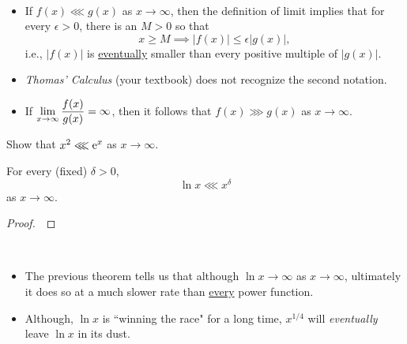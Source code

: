 \begin{remark}\,
\begin{itemize}
\item If $f(x)\lll g(x)$ as $x\to\infty$, then the definition of limit implies that for every $\epsilon>0$, there is an $M>0$ so that
\begin{equation*}
x\ge M\implies |f(x)|\le \epsilon |g(x)|,
\end{equation*}
i.e., $|f(x)|$ is \underline{eventually} smaller than every positive multiple of $|g(x)|$.
\item \textit{Thomas' Calculus} (your textbook) does not recognize the second notation.
\item If $\displaystyle\lim_{x\to\infty}\frac{f(x)}{g(x)} = \infty$, then it follows that $f(x)\ggg g(x)$ as $x\to\infty$.
\end{itemize}
\end{remark}

\begin{example}
Show that $x^2\lll \mathrm{e}^x$ as $x\to\infty$.
\end{example}

\newpage

\begin{theorem}
For every (fixed) $\delta>0$, 
\begin{equation*}
\ln x\lll x^\delta
\end{equation*}
as $x\to\infty$.
\end{theorem}
\begin{proof}\,

\vspace{6in}
\end{proof}

\newpage

\begin{remark}\,
\begin{itemize}
\item The previous theorem tells us that although $\ln x\to\infty$ as $x\to\infty$, ultimately it does so at a much slower rate than \underline{every} power function.
\item Although, $\ln x$ is ``winning the race" for a long time, $x^{1/4}$ will \textit{eventually} leave $\ln x$ in its dust.
\end{itemize}
\end{remark}

